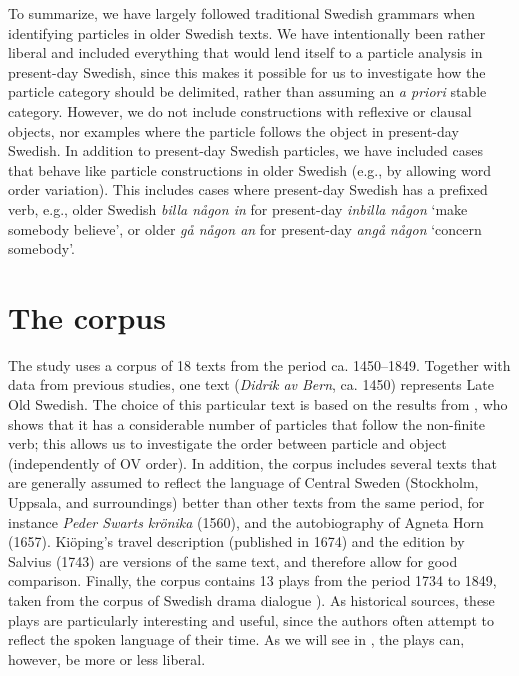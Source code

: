 \documentclass[output=paper]{langscibook}
\begin{document}
To summarize, we have largely followed traditional Swedish grammars when identifying particles in older Swedish texts. We have intentionally been rather liberal and included everything that would lend itself to a particle analysis in present-day Swedish, since this makes it possible for us to investigate how the particle category should be delimited, rather than assuming an \textit{a priori} stable category. However, we do not include constructions with reflexive or clausal objects, nor examples where the particle follows the object in present-day Swedish. In addition to present-day Swedish particles, we have included cases that behave like particle constructions in older Swedish (e.g., by allowing word order variation). This includes cases where present-day Swedish has a prefixed verb, e.g., older Swedish \textit{billa någon in} for present-day \textit{inbilla någon} ‘make somebody believe’, or older \textit{gå någon an} for present-day \textit{angå någon} ‘concern somebody’.


\section{The corpus}\label{sec:lalu:3}


The study uses a corpus of 18 texts from the period ca. 1450–1849. Together with data from previous studies, one text (\textit{Didrik av Bern}, ca. 1450) represents Late Old Swedish. The choice of this particular text is based on the results from \citet{Ljunggren1932}, who shows that it has a considerable number of particles that follow the non-finite verb; this allows us to investigate the order between particle and object (independently of OV order). In addition, the corpus includes several texts that are generally assumed to reflect the language of Central Sweden (Stockholm, Uppsala, and surroundings) better than other texts from the same period, for instance \textit{Peder Swarts krönika} (1560), and the autobiography of Agneta Horn (1657). Kiöping’s travel description (published in 1674) and the edition by Salvius (1743) are versions of the same text, and therefore allow for good comparison. Finally, the corpus contains 13 plays from the period 1734 to 1849, taken from the corpus of Swedish drama dialogue \citealt{MarttalaStromquist2001}). As historical sources, these plays are particularly interesting and useful, since the authors often attempt to reflect the spoken language of their time. As we will see in , the plays can, however, be more or less liberal.
\end{document}
